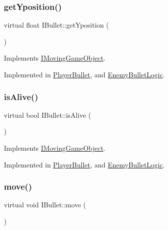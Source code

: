\subsubsection{\texorpdfstring{get\+Yposition()}{getYposition()}}
{\footnotesize\ttfamily virtual float I\+Bullet\+::get\+Yposition (\begin{DoxyParamCaption}{ }\end{DoxyParamCaption})\hspace{0.3cm}{\ttfamily [pure virtual]}}



Implements \hyperlink{class_i_moving_game_object_a153c0017219e17262a9cceddba3f61d6}{I\+Moving\+Game\+Object}.



Implemented in \hyperlink{class_player_bullet_a240cab35d5d909366986b8661ee65d3c}{Player\+Bullet}, and \hyperlink{class_enemy_bullet_logic_a0cfb3013a7613f7f6de91a6db04d03b1}{Enemy\+Bullet\+Logic}.

\mbox{\label{class_i_bullet_ac1252496738126ec94a97512011b9112}} 
\subsubsection{\texorpdfstring{is\+Alive()}{isAlive()}}
{\footnotesize\ttfamily virtual bool I\+Bullet\+::is\+Alive (\begin{DoxyParamCaption}{ }\end{DoxyParamCaption})\hspace{0.3cm}{\ttfamily [pure virtual]}}



Implements \hyperlink{class_i_moving_game_object_ab88f75c872699dd1376e5e83f6188e34}{I\+Moving\+Game\+Object}.



Implemented in \hyperlink{class_player_bullet_ab4e6b1485e9a63ddc00effc7532a9b09}{Player\+Bullet}, and \hyperlink{class_enemy_bullet_logic_a42d10bdfde42178e272997de9b387398}{Enemy\+Bullet\+Logic}.

\mbox{\label{class_i_bullet_a0884074f0bc793fb5a52ac33842622fd}} 
\subsubsection{\texorpdfstring{move()}{move()}}
{\footnotesize\ttfamily virtual void I\+Bullet\+::move (\begin{DoxyParamCaption}{ }\end{DoxyParamCaption})\hspace{0.3cm}{\ttfamily [pure virtual]}}



